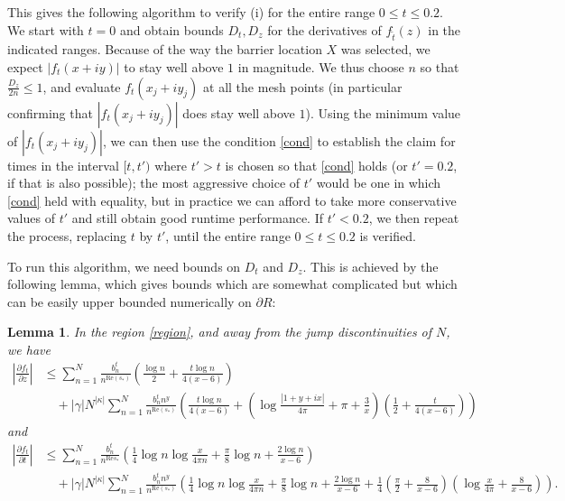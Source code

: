 \documentclass[a4paper,11pt,twoside]{amsart}
\newtheorem{lemma}[theorem]{Lemma}
\begin{document}
This gives the following algorithm to verify (i) for the entire range $0 \leq t \leq 0.2$.  We start with $t=0$ and obtain bounds $D_t, D_z$ for the derivatives of $f_{\tilde t}(z)$ in the indicated ranges.  Because of the way the barrier location $X$ was selected, we expect $|f_t(x+iy)|$ to stay well above $1$ in magnitude.  We thus choose $n$ so that $\frac{D_z}{2n} \leq 1$, and evaluate $f_t(x_j+iy_j)$ at all the mesh points (in particular confirming that $|f_t(x_j+iy_j)|$ does stay well above $1$).  Using the minimum value of $|f_t(x_j+iy_j)|$, we can then use the condition \eqref{cond} to establish the claim for times in the interval $[t,t')$ where $t'>t$ is chosen so that \eqref{cond} holds (or $t'=0.2$, if that is also possible); the most aggressive choice of $t'$ would be one in which \eqref{cond} held with equality, but in practice we can afford to take more conservative values of $t'$ and still obtain good runtime performance.  If $t' < 0.2$, we then repeat the process, replacing $t$ by $t'$, until the entire range $0 \leq t \leq 0.2$ is verified.

To run this algorithm, we need bounds on $D_t$ and $D_z$.  This is achieved by the following lemma, which gives bounds which are somewhat complicated but which can be easily upper bounded numerically on $\partial R$:

\begin{lemma} In the region \eqref{region}, and away from the jump discontinuities of $N$, we have
\begin{align*}
 \left|\frac{\partial f_t}{\partial z}\right| &\leq  \sum_{n=1}^N \frac{b_n^t}{n^{\mathrm{Re}(s_*)}} \left(\frac{\log n}{2} + \frac{t \log n}{4(x-6)}\right) \\
&\quad + |\gamma| N^{|\kappa|} \sum_{n=1}^N \frac{b_n^t n^{y} }{n^{\mathrm{Re}(s_{*})}}
\left( \frac{t \log n}{4(x-6)} + \left(\log \frac{|1+y+ix|}{4\pi} + \pi + \frac{3}{x}\right) \left(\frac{1}{2} + \frac{t}{4(x-6)}\right)\right)
\end{align*}
and
\begin{align*} \left|\frac{\partial f_t}{\partial t}\right| &\leq \sum_{n=1}^N \frac{b_n^t}{n^{\mathrm{Re} s_*}} \left(\frac{1}{4} \log n \log \frac{x}{4\pi n} + \frac{\pi}{8} \log n + \frac{2 \log n}{x-6}\right) \\
&\quad + |\gamma| N^{|\kappa|} \sum_{n=1}^N \frac{b_n^t n^y}{n^{\mathrm{Re}(s_{*})}}
\left(\frac{1}{4} \log n \log \frac{x}{4\pi n} + \frac{\pi}{8} \log n + \frac{2 \log n}{x-6} + \frac{1}{4} \left(\frac{\pi}{2} + \frac{8}{x-6}\right) \left(\log \frac{x}{4\pi} + \frac{8}{x-6}\right)\right).
\end{align*}
\end{lemma}
\end{document}
